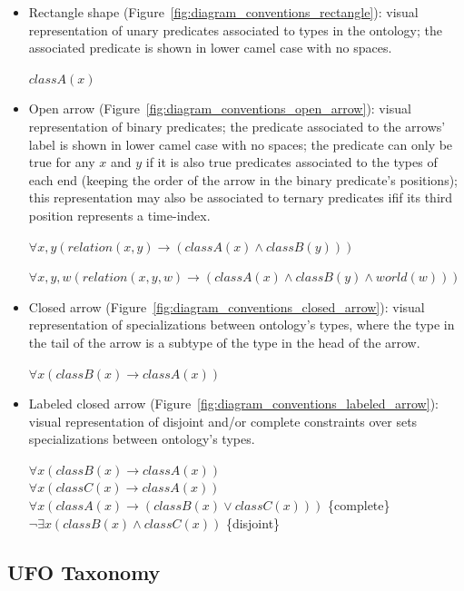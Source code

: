 \documentclass{article}
\begin{document}
\begin{itemize}
    \item Rectangle shape (Figure~\ref{fig:diagram_conventions_rectangle}): visual representation of unary predicates associated to types in the ontology; the associated predicate is shown in lower camel case with no spaces.
    
    $classA(x)$

    \item Open arrow (Figure~\ref{fig:diagram_conventions_open_arrow}): visual representation of binary predicates; the predicate associated to the arrows' label is shown in lower camel case with no spaces; the predicate can only be true for any $x$ and $y$ if it is also true predicates associated to the types of each end (keeping the order of the arrow in the binary predicate's positions); this representation may also be associated to ternary predicates ifif its third position represents a time-index.
    
    $\forall x,y (relation(x,y) \rightarrow (classA(x) \wedge classB(y)))$
    
    $\forall x,y,w (relation(x,y,w) \rightarrow (classA(x) \wedge classB(y) \wedge world(w)))$

    \item Closed arrow (Figure~\ref{fig:diagram_conventions_closed_arrow}): visual representation of specializations between ontology's types, where the type in the tail of the arrow is a subtype of the type in the head of the arrow.
    
    $\forall x (classB(x) \rightarrow classA(x))$

    \item Labeled closed arrow (Figure~\ref{fig:diagram_conventions_labeled_arrow}): visual representation of disjoint and/or complete constraints over sets specializations between ontology's types.
    
    $\forall x (classB(x) \rightarrow classA(x))$\\
    $\forall x (classC(x) \rightarrow classA(x))$\\
    $\forall x (classA(x) \rightarrow (classB(x) \vee classC(x)))$  \hfill \{complete\}\\
    $\neg\exists x (classB(x) \wedge classC(x))$  \hfill \{disjoint\}
\end{itemize}

\subsection{UFO Taxonomy}
\end{document}
